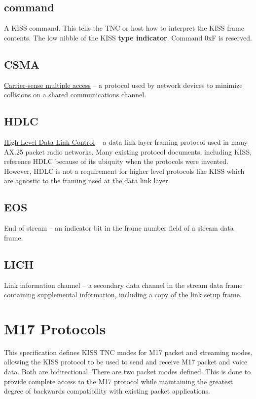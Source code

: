 \documentclass[a4paper,11pt]{book}
\begin{document}
\subsection{command}

A KISS command. This tells the TNC or host how to interpret the KISS frame contents. The low nibble of the KISS \textbf{type indicator}. Command 0xF is reserved.

\subsection{CSMA}

\href{https://en.wikipedia.org/wiki/Carrier-sense_multiple_access}{Carrier-sense multiple access} -- a protocol used by network devices to minimize collisions on a shared communications channel.

\subsection{HDLC}

\href{https://en.wikipedia.org/wiki/High-Level_Data_Link_Control}{High-Level Data Link Control} -- a data link layer framing protocol used in many AX.25 packet radio networks. Many existing protocol documents, including KISS, reference HDLC because of its ubiquity when the protocols were invented. However, HDLC is not a requirement for higher level protocols like KISS which are agnostic to the framing used at the data link layer.

\subsection{EOS}

End of stream -- an indicator bit in the frame number field of a stream data frame.

\subsection{LICH}

Link information channel -- a secondary data channel in the stream data frame containing supplemental information, including a copy of the link setup frame.

\section{M17 Protocols}

This specification defines KISS TNC modes for M17 packet and streaming modes, allowing the KISS protocol to be used to send and receive M17 packet and voice data. Both are bidirectional. There are two packet modes defined. This is done to provide complete access to the M17 protocol while maintaining the greatest degree of backwards compatibility with existing packet applications.
\end{document}

